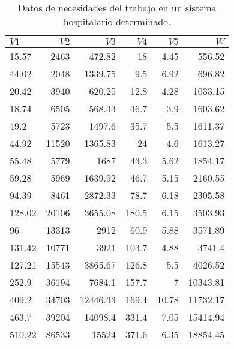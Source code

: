 \documentclass[10.5pt,notitlepage]{article}
\theoremstyle{plain}
\begin{document}
 \begin{table}[htbp]
        \caption{Datos de necesidades del trabajo en un sistema hospitalario determinado.}
        \centering\begin{tabular}{@{}l@{\hskip 0.3in}r@{\hskip 0.3in}r@{\hskip 0.3in}r@{\hskip 0.3in}r@{\hskip 0.3in}r@{}}
            \toprule
            $V1$ & $V2$ & $V3$ & $V4$ &\(V5\) &\(W\)\\
            \midrule
 15.57  &  2463 &     472.82&    18  &    4.45 &    556.52\\
 44.02  &  2048&   1339.75 &   9.5   & 6.92    & 696.82\\
 20.42  &  3940 &     620.25&    12.8&    4.28&    1033.15\\
 18.74  &  6505 &     568.33&    36.7 &   3.9   &  1603.62\\
 49.2   &  5723 &    1497.6 &    35.7&    5.5  &   1611.37\\
 44.92  & 11520 &    1365.83&    24  &    4.6    & 1613.27\\
 55.48  &  5779 &    1687   &    43.3&    5.62 &   1854.17\\
 59.28  &  5969 &    1639.92&    46.7&    5.15   & 2160.55\\
 94.39  &  8461 &    2872.33&    78.7&    6.18 &   2305.58\\
128.02  & 20106 &    3655.08&   180.5&    6.15   & 3503.93\\
 96     & 13313 &    2912   &    60.9&    5.88 &   3571.89\\
131.42  & 10771 &    3921   &   103.7&    4.88   & 3741.4\\
127.21  & 15543 &    3865.67&   126.8&    5.5 &    4026.52\\
252.9   & 36194 &    7684.1 &   157.7&    7     & 10343.81\\
409.2  &  34703 &   12446.33&   169.4&   10.78&   11732.17\\
463.7  &  39204 &    14098.4&   331.4&    7.05  & 15414.94\\
510.22 &  86533 &    15524  &   371.6&    6.35 &  18854.45\\
            \bottomrule
        \end{tabular}
        \label{tab:1}
\end{table}
\end{document}
